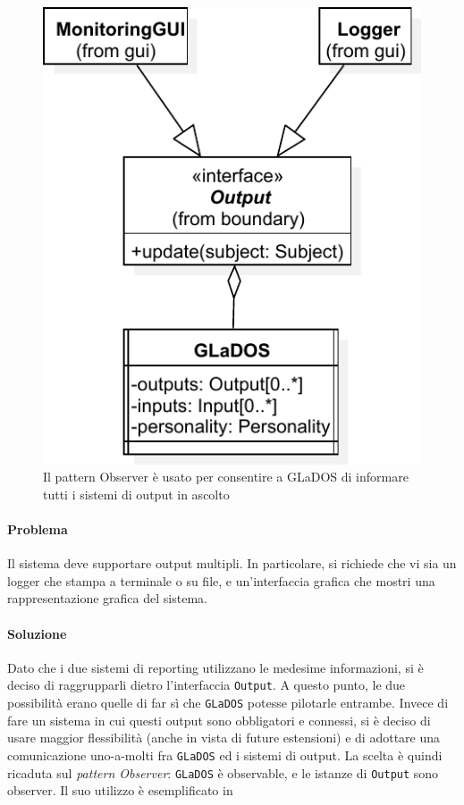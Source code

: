 \documentclass[a4paper,12pt]{report}
\begin{document}
\begin{figure}[H]
	\centering{}
	\includegraphics[width=.7\textwidth]{img/observer}
	\caption{Il pattern Observer è usato per consentire a GLaDOS di informare tutti i sistemi di output in ascolto}
	\label{img:observer}
\end{figure}

\paragraph{Problema} Il sistema deve supportare output multipli. In particolare, si richiede che vi sia un logger che stampa a terminale o su file,
e un'interfaccia grafica che mostri una rappresentazione grafica del sistema.

\paragraph{Soluzione} Dato che i due sistemi di reporting utilizzano le medesime informazioni, si è deciso di raggrupparli dietro l'interfaccia \texttt{Output}.
A questo punto, le due possibilità erano quelle di far sì che \texttt{GLaDOS} potesse pilotarle entrambe.
Invece di fare un sistema in cui questi output sono obbligatori e connessi, si è deciso di usare maggior flessibilità (anche in vista di future estensioni)
e di adottare una comunicazione uno-a-molti fra \texttt{GLaDOS} ed i sistemi di output.
La scelta è quindi ricaduta sul \textit{pattern Observer}: \texttt{GLaDOS} è observable, e le istanze di \texttt{Output} sono observer.
%
Il suo utilizzo è esemplificato in 
\end{document}
